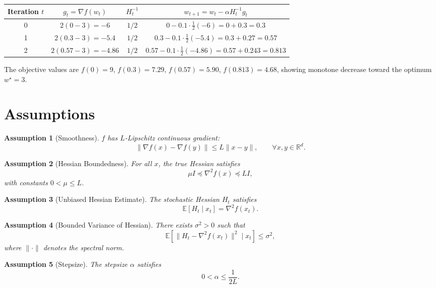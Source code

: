 \documentclass[11pt]{article}
\newtheorem{assumption}{Assumption}
\newcommand{\E}{\mathbb{E}}
\newcommand{\R}{\mathbb{R}}
\begin{document}
\begin{center}
\begin{tabular}{c|c|c|c}
Iteration $t$ & $g_{t}= \nabla f(w_{t})$ & $H_{t}^{-1}$ & $w_{t+1}=w_{t}-\alpha H_{t}^{-1}g_{t}$ \\ \hline
0 & $2(0-3)=-6$ & $1/2$ & $0-0.1\cdot\frac{1}{2}(-6)=0+0.3=0.3$ \\
1 & $2(0.3-3)=-5.4$ & $1/2$ & $0.3-0.1\cdot\frac{1}{2}(-5.4)=0.3+0.27=0.57$ \\
2 & $2(0.57-3)=-4.86$ & $1/2$ & $0.57-0.1\cdot\frac{1}{2}(-4.86)=0.57+0.243=0.813$ \\
\end{tabular}
\end{center}
The objective values are $f(0)=9$, $f(0.3)=7.29$, $f(0.57)=5.90$, $f(0.813)=4.68$,
showing monotone decrease toward the optimum $w^{\star}=3$.

\newpage
\section*{Assumptions}
\begin{assumption}[Smoothness]\label{ass:smooth}
$f$ has $L$‑Lipschitz continuous gradient:
\[
\|\nabla f(x)-\nabla f(y)\|\le L\|x-y\|,\qquad\forall x,y\in\R^{d}.
\]
\end{assumption}

\begin{assumption}[Hessian Boundedness]\label{ass:hessian}
For all $x$, the true Hessian satisfies
\[
\mu I \preceq \nabla^{2}f(x) \preceq L I,
\]
with constants $0<\mu\le L$.
\end{assumption}

\begin{assumption}[Unbiased Hessian Estimate]\label{ass:unbiased}
The stochastic Hessian $H_{t}$ satisfies
\[
\E[H_{t}\mid x_{t}]=\nabla^{2}f(x_{t}).
\]
\end{assumption}

\begin{assumption}[Bounded Variance of Hessian]\label{ass:var}
There exists $\sigma^{2}>0$ such that
\[
\E\!\left[\|H_{t}-\nabla^{2}f(x_{t})\|^{2}\mid x_{t}\right]\le\sigma^{2},
\]
where $\|\cdot\|$ denotes the spectral norm.
\end{assumption}

\begin{assumption}[Stepsize]\label{ass:step}
The stepsize $\alpha$ satisfies
\[
0<\alpha\le \frac{1}{2L}.
\]
\end{assumption}
\end{document}
